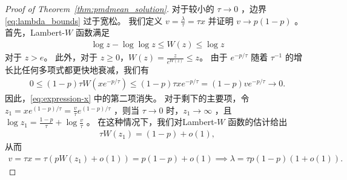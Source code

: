 \documentclass{article}
\theoremstyle{plain}
\theoremstyle{definition}
\theoremstyle{remark}
\newcommand{\cW}{W}
\begin{document}
\begin{proof}[Proof of Theorem~\ref{thm:pmdmean_solution}]
    对于较小的 $\tau\to 0$ ，边界 \eqref{eq:lambda_bounds} 过于宽松。  
我们定义 $v=\frac{\lambda}{\tau}=\tau x$ 并证明 $v\to p(1-p)$ 。  
首先，Lambert-$W$ 函数满足 
    \begin{align*}
        \log z-\log\log z\leq \cW(z)\leq \log z
    \end{align*}
    对于 $z>e$。  
此外，对于 $z\geq 0$，$\cW(z)=\frac{z}{e^{\cW(z)}}\leq z$。  
由于 $e^{-p/\tau}$ 随着 $\tau^{-1}$ 的增长比任何多项式都更快地衰减，我们有 
    \begin{align*}
        0\leq (1-p)\tau \cW(xe^{-p/\tau})
        \leq (1-p)\tau xe^{-p/\tau}
        =(1-p)ve^{-p/\tau}\to 0.
    \end{align*}
    因此，\eqref{eq:expression-x} 中的第二项消失。  
对于剩下的主要项，令 $z_1=xe^{(1-p)/\tau}=\frac{v}{\tau}e^{(1-p)/\tau}$ ，则当 $\tau\to 0$ 时，$z_1\to\infty$ ，且 $\log z_1=\frac{1-p}{\tau}+\log\frac{v}{\tau}$ 。  
在这种情况下，我们对Lambert-$W$ 函数的估计给出 
    \begin{align*}
        \tau \cW(z_1)
        =(1-p) + o(1),
    \end{align*}
    从而 
    \begin{align*}
        v=\tau x
        =\tau\left(p \cW(z_1) + o(1)\right)
        =p(1-p) + o(1)
        \implies 
        \lambda=\tau p(1-p)(1+o(1)).
    \end{align*}
\end{proof}
\end{document}
